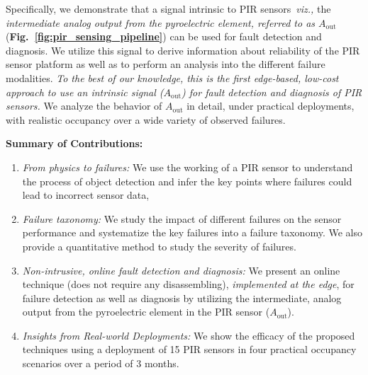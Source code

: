 \documentclass[manuscript]{acmart}
\newcommand{\viz}{{\it viz.,}\xspace}
\newcommand{\aout}{$A_{\text{out}}$\xspace}
\begin{document}
Specifically, we demonstrate that a signal intrinsic to PIR sensors~\viz the \textit{intermediate analog output from the pyroelectric element, referred to as \aout} ({\bfseries Fig.~\ref{fig:pir_sensing_pipeline}}) can be used for fault detection and diagnosis. We utilize this signal to derive information about reliability of the PIR sensor platform as well as to perform an analysis into the different failure modalities. \textit{To the best of our knowledge, this is the first edge-based, low-cost approach to use an intrinsic signal (\aout) for fault detection and diagnosis of PIR sensors.} We analyze the behavior of \aout in detail, under practical deployments, with realistic occupancy
over a wide variety of observed failures. 

\noindent \textbf{Summary of Contributions:}
\begin{enumerate}[leftmargin=*]
	\itemsep0pt
	\item \textit{From physics to failures:} We use the working of a PIR sensor to understand the process of object detection and infer the key points where failures could lead to incorrect sensor data,
	\item \textit{Failure taxonomy:} We study the impact of different failures on the sensor performance and systematize the key failures into a failure taxonomy. We also provide a quantitative method to study the severity of failures.
	
	\item \textit{Non-intrusive, online fault detection and diagnosis:} We present an online technique (does not require any disassembling), \emph{implemented at the edge}, for failure detection as well as diagnosis by utilizing the intermediate, analog output from the pyroelectric element in the PIR sensor (\aout). 
	\item \textit{Insights from Real-world Deployments:} We show the efficacy of the proposed techniques using a deployment of 15 PIR sensors in four practical occupancy scenarios over a period of 3 months.
\end{enumerate}
\end{document}
